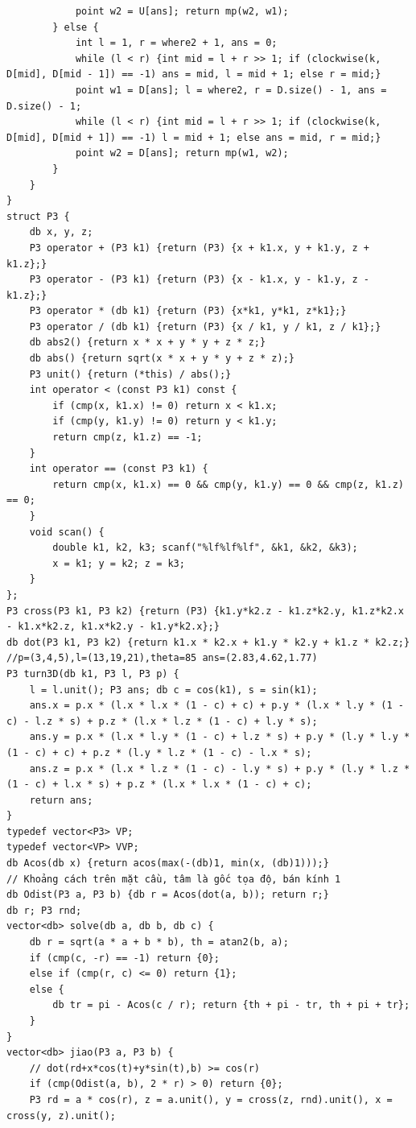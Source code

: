 \documentclass[11pt]{article}
\begin{document}
\begin{verbatim}
			point w2 = U[ans]; return mp(w2, w1);
		} else {
			int l = 1, r = where2 + 1, ans = 0;
			while (l < r) {int mid = l + r >> 1; if (clockwise(k, D[mid], D[mid - 1]) == -1) ans = mid, l = mid + 1; else r = mid;}
			point w1 = D[ans]; l = where2, r = D.size() - 1, ans = D.size() - 1;
			while (l < r) {int mid = l + r >> 1; if (clockwise(k, D[mid], D[mid + 1]) == -1) l = mid + 1; else ans = mid, r = mid;}
			point w2 = D[ans]; return mp(w1, w2);
		}
	}
}
struct P3 {
	db x, y, z;
	P3 operator + (P3 k1) {return (P3) {x + k1.x, y + k1.y, z + k1.z};}
	P3 operator - (P3 k1) {return (P3) {x - k1.x, y - k1.y, z - k1.z};}
	P3 operator * (db k1) {return (P3) {x*k1, y*k1, z*k1};}
	P3 operator / (db k1) {return (P3) {x / k1, y / k1, z / k1};}
	db abs2() {return x * x + y * y + z * z;}
	db abs() {return sqrt(x * x + y * y + z * z);}
	P3 unit() {return (*this) / abs();}
	int operator < (const P3 k1) const {
		if (cmp(x, k1.x) != 0) return x < k1.x;
		if (cmp(y, k1.y) != 0) return y < k1.y;
		return cmp(z, k1.z) == -1;
	}
	int operator == (const P3 k1) {
		return cmp(x, k1.x) == 0 && cmp(y, k1.y) == 0 && cmp(z, k1.z) == 0;
	}
	void scan() {
		double k1, k2, k3; scanf("%lf%lf%lf", &k1, &k2, &k3);
		x = k1; y = k2; z = k3;
	}
};
P3 cross(P3 k1, P3 k2) {return (P3) {k1.y*k2.z - k1.z*k2.y, k1.z*k2.x - k1.x*k2.z, k1.x*k2.y - k1.y*k2.x};}
db dot(P3 k1, P3 k2) {return k1.x * k2.x + k1.y * k2.y + k1.z * k2.z;}
//p=(3,4,5),l=(13,19,21),theta=85 ans=(2.83,4.62,1.77)
P3 turn3D(db k1, P3 l, P3 p) {
	l = l.unit(); P3 ans; db c = cos(k1), s = sin(k1);
	ans.x = p.x * (l.x * l.x * (1 - c) + c) + p.y * (l.x * l.y * (1 - c) - l.z * s) + p.z * (l.x * l.z * (1 - c) + l.y * s);
	ans.y = p.x * (l.x * l.y * (1 - c) + l.z * s) + p.y * (l.y * l.y * (1 - c) + c) + p.z * (l.y * l.z * (1 - c) - l.x * s);
	ans.z = p.x * (l.x * l.z * (1 - c) - l.y * s) + p.y * (l.y * l.z * (1 - c) + l.x * s) + p.z * (l.x * l.x * (1 - c) + c);
	return ans;
}
typedef vector<P3> VP;
typedef vector<VP> VVP;
db Acos(db x) {return acos(max(-(db)1, min(x, (db)1)));}
// Khoảng cách trên mặt cầu, tâm là gốc tọa độ, bán kính 1
db Odist(P3 a, P3 b) {db r = Acos(dot(a, b)); return r;}
db r; P3 rnd;
vector<db> solve(db a, db b, db c) {
	db r = sqrt(a * a + b * b), th = atan2(b, a);
	if (cmp(c, -r) == -1) return {0};
	else if (cmp(r, c) <= 0) return {1};
	else {
		db tr = pi - Acos(c / r); return {th + pi - tr, th + pi + tr};
	}
}
vector<db> jiao(P3 a, P3 b) {
	// dot(rd+x*cos(t)+y*sin(t),b) >= cos(r)
	if (cmp(Odist(a, b), 2 * r) > 0) return {0};
	P3 rd = a * cos(r), z = a.unit(), y = cross(z, rnd).unit(), x = cross(y, z).unit();

\end{verbatim}
\end{document}
